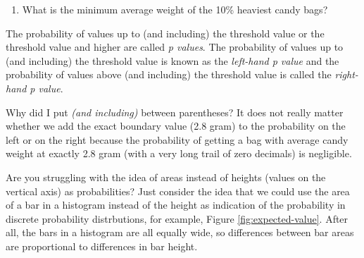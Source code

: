 \documentclass[a4paper]{book}
\newenvironment{Shaded}{\begin{snugshade}}{\end{snugshade}}
\newcommand{\KeywordTok}[1]{\textcolor[rgb]{0,0,0}{\textbf{#1}}}
\newcommand{\DecValTok}[1]{\textcolor[rgb]{0.00,0.00,0.00}{#1}}
\newcommand{\FloatTok}[1]{\textcolor[rgb]{0.00,0.00,0.00}{#1}}
\newcommand{\StringTok}[1]{\textcolor[rgb]{0.00,0.00,0.00}{#1}}
\newcommand{\ControlFlowTok}[1]{\textcolor[rgb]{0.00,0.00,0.00}{\textbf{#1}}}
\newcommand{\OperatorTok}[1]{\textcolor[rgb]{0.00,0.00,0.00}{\textbf{#1}}}
\newcommand{\NormalTok}[1]{#1}
\providecommand{\tightlist}{%
  \setlength{\itemsep}{0pt}\setlength{\parskip}{0pt}}
\theoremstyle{definition}
\theoremstyle{definition}
\theoremstyle{definition}
\theoremstyle{remark}
\begin{document}
\begin{enumerate}
\def\labelenumi{\arabic{enumi}.}
\setcounter{enumi}{3}
\tightlist
\item
  What is the minimum average weight of the 10\% heaviest candy bags?
\end{enumerate}

\begin{Shaded}
\end{Shaded}

The probability of values up to (and including) the threshold value or
the threshold value and higher are called \emph{p values}. The
probability of values up to (and including) the threshold value is known
as the \emph{left-hand p value} and the probability of values above (and
including) the threshold value is called the \emph{right-hand p value}.

Why did I put \emph{(and including)} between parentheses? It does not
really matter whether we add the exact boundary value (2.8 gram) to the
probability on the left or on the right because the probability of
getting a bag with average candy weight at exactly 2.8 gram (with a very
long trail of zero decimals) is negligible.

Are you struggling with the idea of areas instead of heights (values on
the vertical axis) as probabilities? Just consider the idea that we
could use the area of a bar in a histogram instead of the height as
indication of the probability in discrete probability distrbutions, for
example, Figure \ref{fig:expected-value}. After all, the bars in a
histogram are all equally wide, so differences between bar areas are
proportional to differences in bar height.
\end{document}
